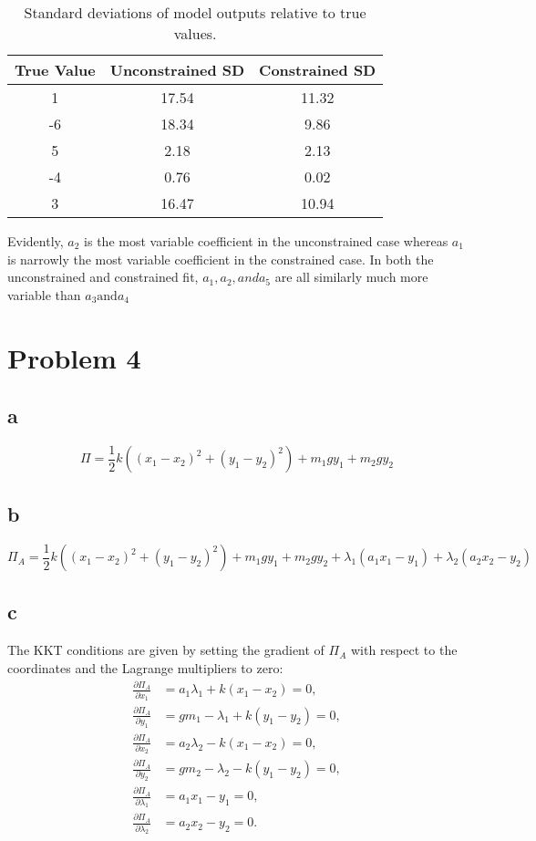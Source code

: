 \documentclass[10pt]{article}
\begin{document}
\begin{table}[h]
\centering
\begin{tabular}{ccc}
\toprule
True Value & Unconstrained SD & Constrained SD \\
\midrule
1          & 17.54            & 11.32          \\
-6         & 18.34            & 9.86           \\
5          & 2.18             & 2.13           \\
-4         & 0.76             & 0.02           \\
3          & 16.47            & 10.94          \\
\bottomrule
\end{tabular}
\caption{Standard deviations of model outputs relative to true values.}
\end{table}

Evidently, $a_2$ is the most variable coefficient in the unconstrained case whereas $a_1$ is narrowly the most variable coefficient in the constrained case. In both the unconstrained and constrained fit, $a_1, a_2, and a_5$ are all similarly much more variable than $a_3 \text{and} a_4$


\newpage
\section{Problem 4}
\subsection{a}
\[
\Pi = \frac{1}{2}k((x_1 - x_2)^2 + (y_1 - y_2)^2) + m_1gy_1 + m_2gy_2
\]

\subsection{b}
\[
\Pi_A = \frac{1}{2}k((x_1 - x_2)^2 + (y_1 - y_2)^2) + m_1gy_1 + m_2gy_2 + \lambda_1(a_1x_1 - y_1) + \lambda_2(a_2x_2 - y_2)
\]

\subsection{c}
The KKT conditions are given by setting the gradient of \( \Pi_A \) with respect to the coordinates and the Lagrange multipliers to zero:
\begin{align*}
\frac{\partial \Pi_A}{\partial x_1} &= a_1\lambda_1 + k(x_1 - x_2) = 0, \\
\frac{\partial \Pi_A}{\partial y_1} &= g m_1 - \lambda_1 + k(y_1 - y_2) = 0, \\
\frac{\partial \Pi_A}{\partial x_2} &= a_2\lambda_2 - k(x_1 - x_2) = 0, \\
\frac{\partial \Pi_A}{\partial y_2} &= g m_2 - \lambda_2 - k(y_1 - y_2) = 0, \\
\frac{\partial \Pi_A}{\partial \lambda_1} &= a_1x_1 - y_1 = 0, \\
\frac{\partial \Pi_A}{\partial \lambda_2} &= a_2x_2 - y_2 = 0.
\end{align*}
\end{document}
